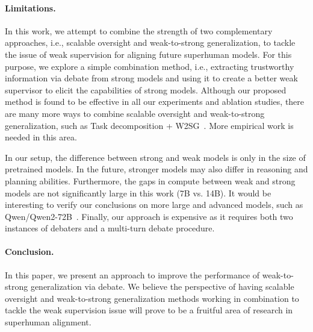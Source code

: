 \documentclass[letterpaper]{article} %
\begin{document}
\paragraph{Limitations.}
In this work, we attempt to combine the strength of two complementary approaches, i.e., scalable oversight and weak-to-strong generalization, to tackle the issue of weak supervision for aligning future superhuman models.
For this purpose, we explore a simple combination method, i.e., extracting trustworthy information via debate from strong models and using it to create a better weak supervisor to elicit the capabilities of strong models.
Although our proposed method is found to be effective in all our experiments and ablation studies, there are many more ways to combine scalable oversight and weak-to-strong generalization, such as Task decomposition + W2SG~\cite{JAN2023Combining}.
More empirical work is needed in this area.

In our setup, the difference between strong and weak models is only in the size of pretrained models. In the future, stronger models may also differ in reasoning and planning abilities.
Furthermore, the gaps in compute between weak and strong models are not significantly large in this work (7B vs. 14B).
It would be interesting to verify our conclusions on more large and advanced models, such as Qwen/Qwen2-72B~\cite{qwen2}.
Finally, our approach is expensive as it requires both two instances of debaters and a multi-turn debate procedure.

\paragraph{Conclusion.}
In this paper, we present an approach to improve the performance of weak-to-strong generalization via debate.
We believe the perspective of having scalable oversight and weak-to-strong generalization methods working in combination to tackle the weak supervision issue will prove to be a fruitful area of research in superhuman alignment.


\end{document}
